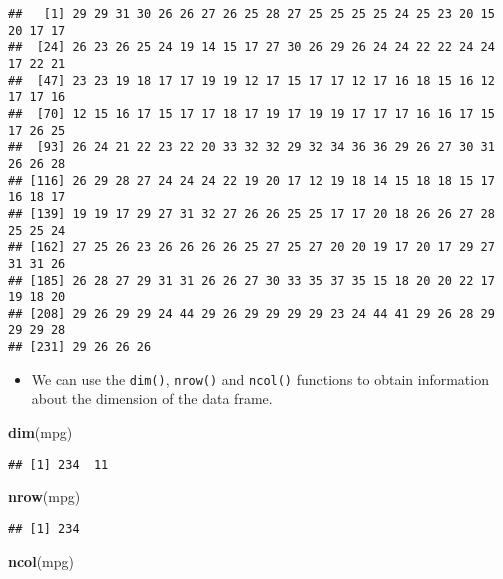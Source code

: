 \documentclass[]{book}
\newenvironment{Shaded}{\begin{snugshade}}{\end{snugshade}}
\newcommand{\KeywordTok}[1]{\textcolor[rgb]{0.13,0.29,0.53}{\textbf{#1}}}
\newcommand{\NormalTok}[1]{#1}
\newcommand{\OperatorTok}[1]{\textcolor[rgb]{0.81,0.36,0.00}{\textbf{#1}}}
\providecommand{\tightlist}{%
  \setlength{\itemsep}{0pt}\setlength{\parskip}{0pt}}
\begin{document}
\begin{Shaded}
\end{Shaded}

\begin{verbatim}
##   [1] 29 29 31 30 26 26 27 26 25 28 27 25 25 25 25 24 25 23 20 15 20 17 17
##  [24] 26 23 26 25 24 19 14 15 17 27 30 26 29 26 24 24 22 22 24 24 17 22 21
##  [47] 23 23 19 18 17 17 19 19 12 17 15 17 17 12 17 16 18 15 16 12 17 17 16
##  [70] 12 15 16 17 15 17 17 18 17 19 17 19 19 17 17 17 16 16 17 15 17 26 25
##  [93] 26 24 21 22 23 22 20 33 32 32 29 32 34 36 36 29 26 27 30 31 26 26 28
## [116] 26 29 28 27 24 24 24 22 19 20 17 12 19 18 14 15 18 18 15 17 16 18 17
## [139] 19 19 17 29 27 31 32 27 26 26 25 25 17 17 20 18 26 26 27 28 25 25 24
## [162] 27 25 26 23 26 26 26 26 25 27 25 27 20 20 19 17 20 17 29 27 31 31 26
## [185] 26 28 27 29 31 31 26 26 27 30 33 35 37 35 15 18 20 20 22 17 19 18 20
## [208] 29 26 29 29 24 44 29 26 29 29 29 29 23 24 44 41 29 26 28 29 29 29 28
## [231] 29 26 26 26
\end{verbatim}

\begin{itemize}
\tightlist
\item
  We can use the \texttt{dim()}, \texttt{nrow()} and \texttt{ncol()} functions to obtain information about the dimension of the data frame.
\end{itemize}

\begin{Shaded}
\begin{Highlighting}[]
\KeywordTok{dim}\NormalTok{(mpg)}
\end{Highlighting}
\end{Shaded}

\begin{verbatim}
## [1] 234  11
\end{verbatim}

\begin{Shaded}
\begin{Highlighting}[]
\KeywordTok{nrow}\NormalTok{(mpg)}
\end{Highlighting}
\end{Shaded}

\begin{verbatim}
## [1] 234
\end{verbatim}

\begin{Shaded}
\begin{Highlighting}[]
\KeywordTok{ncol}\NormalTok{(mpg)}
\end{Highlighting}
\end{Shaded}
\end{document}
